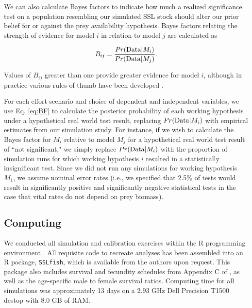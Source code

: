 \documentclass[11pt]{article}
\begin{document}
We can also calculate Bayes factors \citep{Jeffreys1935,KassRaftery1995} to indicate how much a realized significance test on a population resembling our simulated SSL stock should alter our prior belief for or against the prey availability hypothesis.  Bayes factors relating the strength of evidence for model $i$ in relation to model $j$ are calculated as
\begin{linenomath}
  \begin{equation}
     \label{eq:BF}
     B_{ij}=\frac{Pr({\rm Data} | M_i)}{Pr({\rm Data} | M_j)}.
  \end{equation}
\end{linenomath}
Values of $B_{ij}$ greater than one provide greater evidence for model $i$, although in practice various rules of thumb have been developed \citep[e.g., that values of $B_{ij}$ between 1/3 and 3 provide little evidence with which to distinguish performance of models $i$ and $j$;][]{KassRaftery1995}.


For each effort scenario and choice of dependent and independent variables, we use Eq. \ref{eq:BF} to calculate the posterior probability of each working hypothesis under a hypothetical real world test result, replacing $Pr({\rm Data}|M_i)$ with empirical estimates from our simulation study.  For instance, if we wish to calculate the Bayes factor for $M_i$ relative to model $M_j$ for a hypothetical real world test result of ``not significant," we simply replace $Pr({\rm Data}|M_i)$ with the proportion of simulation runs for which working hypothesis $i$ resulted in a statistically insignificant test.  Since we did not run any simulations for working hypothesis $M_1$, we assume nominal error rates (i.e., we specified that 2.5\% of tests would result in significantly positive and significantly negative statistical tests in the case that vital rates do not depend on prey biomass).

\subsection{Computing}

We conducted all simulation and calibration exercises within the R programming environment \citep{RTeam2012}.  All requisite code to recreate analyses has been assembled into an R package, \texttt{SSLfish}, which is available from the authors upon request.  This package also includes survival and fecundity schedules from Appendix C of \citet{HolmesEtAl2007}, as well as the age-specific male to female survival ratios. Computing time for all simulations was approximately 13 days on a 2.93 GHz Dell Precision T1500 destop with 8.0 GB of RAM.
\end{document}
